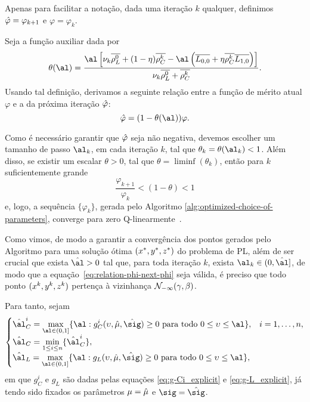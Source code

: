 Apenas para facilitar a notação, dada uma iteração $k$ qualquer, definimos $\hat{\varphi} = \varphi_{k+1}$ e $\varphi = \varphi_{k}$.

Seja a função auxiliar  dada por
\begin{equation}
	\label{eq:theta}
\theta(\al) =  \dfrac{\al\left[ \nuk \dbvec{\rho_L^{0}} + (1-\eta)\rhoCkb  - \al\left(\dbvec{L_{0,0}} + \eta\rhoCkb  \dbvec{L_{1,0}}
\right) \right]}{\nuk \dbvec{\rho_L^{0}} +
\rhoCkb }.
\end{equation}
Usando tal definição, derivamos a seguinte relação entre a função de mérito atual  $\varphi$  e a da próxima iteração  $\hat{\varphi}$: 
\begin{equation}
	\label{eq:relation-phi-next-phi}
	 			{\nextphi} = (1- \theta(\al))\varphi.
\end{equation}


Como é necessário garantir que  $\hat{\varphi}  $  seja não negativa, devemos escolher um tamanho de passo  $\al_k$, em cada iteração $k$, tal que  $\theta_k = \theta(\al_k)<1$. Além disso, se existir um escalar $\theta>0$, tal que $\theta = \liminf (\theta_k)$, 	 então para $k$ suficientemente grande
\begin{equation}\label{eq:nextphi-philessthan1}
\frac{{\varphi_{k+1}}}{\varphi_{k}} < (1- \theta) < 1
\end{equation}
e, logo, a sequência $\{\varphi_k\}$, gerada pelo Algoritmo \ref{alg:optimized-choice-of-parameters}, converge para zero Q-linearmente~\cite{Ortega:2000vd}.




Como vimos, de modo a garantir a convergência dos pontos gerados pelo Algoritmo para uma solução ótima $(x^*,y^*,z^*)$ do problema de \ac{PL}, além de ser  crucial que exista $\hat{\al}>0$  tal que,  para toda iteração $k$, exista  $\al_k\in(0,\hat{\al}]$, de modo que a equação~\eqref{eq:relation-phi-next-phi} seja válida, é preciso que todo   ponto  $(x^{k} ,y^{k},z^{k})$ pertença à vizinhança $\mathcal{N}_{-\infty}(\gamma,\beta)$.

Para tanto, sejam  
\begin{equation}
	\label{eq:al-C+al-L}
\begin{cases}
	\hat{\al}_{C}^{i} = \displaystyle \max_{\al\in (0,1]} \{ \al : g_{C}^{i}(\upsilon,\nextmu,\nextsig)\geq0 \text{ para todo } 0 \leq \upsilon\leq \al  \}, & i = 1,\ldots,n,\\
	\hat{\al}_{C} = \displaystyle \min_{1\leq i \leq n} \{\hat{\al}_{C}^{i}\}, \\
	\hat{\al}_{L} = \displaystyle \max_{\al\in (0,1]} \{ \al : g_{L}(\upsilon,\nextmu,\nextsig)\geq0 \text{ para todo } 0 \leq  \upsilon\leq \al  \},
\end{cases}
\end{equation}
em que $g_{C}^{i}$ e $g_{L}$ são dadas pelas equações  \eqref{eq:g-Ci_explicit} e \eqref{eq:g-L_explicit}, já tendo sido fixados os parâmetros $\mu=\hat{\mu}$ e $\sig=\nextsig$.


